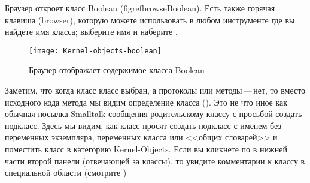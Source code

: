 \documentclass[a4paper,10pt,twoside]{book}
\begin{document}

Браузер откроет класс Boolean (figref{browseBoolean}).
Есть также горячая клавиша (browser), которую можете
использовать в любом инструменте где вы найдете имя класса; выберите имя и наберите . 




\begin{figure}[hbt]
\centerline {\texttt{[image: Kernel-objects-boolean]}}
\caption{Браузер отображает содержимое класса Boolean
}
\end{figure}


Заметим, что когда класс  класс выбран, а протоколы или
методы\,---\,нет, то вместо исходного кода метода мы видим
определение класса (). Это не что иное как обычная
посылка Smalltalk-сообщения родительскому классу с просьбой создать
подкласс. Здесь мы видим, как  класс  просят создать подкласс
с именем  без переменных экземпляра, переменных класса или
<<общих словарей>> и поместить класс  в категорию
Kernel-Objects. Если вы кликнете по  в нижней части второй
панели (отвечающей за классы), то увидите комментарии к классу в
специальной области (смотрите ) 
\end{document}

